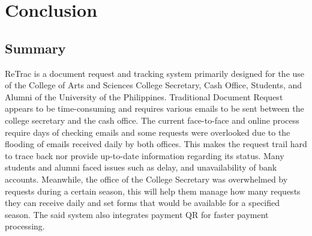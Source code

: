 \chapter{Conclusion}
\section{Summary}
ReTrac is a document request and tracking system primarily designed for the use of the College of Arts and Sciences College Secretary, Cash Office, Students, and Alumni of the University of the Philippines. Traditional Document Request appears to be time-consuming and requires various emails to be sent between the college secretary and the cash office. The current face-to-face and online process require days of checking emails and some requests were overlooked due to the flooding of emails received daily by both offices. This makes the request trail hard to trace back nor provide up-to-date information regarding its status. Many students and alumni faced issues such as delay, and unavailability of bank accounts. Meanwhile, the office of the College Secretary was overwhelmed by requests during a certain season, this will help them manage how many requests they can receive daily and set forms that would be available for a specified season. The said system also integrates payment QR for faster payment processing. 

